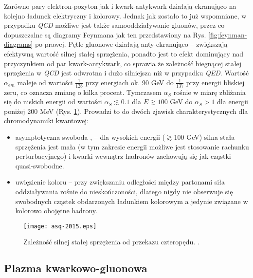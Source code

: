 Zarówno pary elektron-pozyton jak i kwark-antykwark działają ekranująco na kolejno ładunek elektryczny i kolorowy. Jednak jak zostało to już wspomniane, w przypadku \textit{QCD} możliwe jest także samooddziaływanie gluonów, przez co dopuszczalne są diagramy Feynmana jak ten przedstawiony na Rys. \ref{fig:feynman-diagrams} po prawej. Pętle gluonowe działają anty-ekranująco -- zwiększają efektywną wartość silnej stałej sprzężenia, ponadto jest to efekt dominujący nad przyczynkiem od par kwark-antykwark, co sprawia że zależność biegnącej stałej sprzężenia w \textit{QCD} jest odwrotna i dużo silniejsza niż w przypadku \textit{QED}. Wartość $\alpha_{em}$ maleje od wartości $\frac{1}{128}$ przy energiach ok. 90 GeV do $\frac{1}{137}$ przy energii bliskiej zeru, co oznacza zmianę o kilka procent. 
Tymczasem $\alpha_S$ rośnie w miarę zbliżania się do niskich energii od wartości $\alpha_S\lesssim 0.1$ dla $E \gtrsim 100$ GeV do $\alpha_S > 1$ dla energii poniżej 200 MeV (Rys. \ref{fig:running-coupling-const}). Prowadzi to do dwóch zjawisk charakterystycznych dla chromodynamiki kwantowej: 
\begin{itemize}
	\item asymptotyczna swoboda  \cite{Gross:1973id}, \cite{Politzer:1973fx} -- dla wysokich energii ($\gtrsim 100$ GeV) silna stała sprzężenia jest mała (w tym zakresie energii możliwe jest stosowanie rachunku perturbacyjnego) i kwarki wewnątrz hadronów zachowują się jak cząstki quasi-swobodne.
	\item uwięzienie koloru  -- przy zwiększaniu odległości między partonami siła oddziaływania rośnie do nieskończoności, dlatego nigdy nie obserwuje się swobodnych cząstek obdarzonych ładunkiem kolorowym a jedynie związane w kolorowo obojętne hadrony.
\end{itemize}


\begin{figure}[h]
	\centering
	\texttt{[image: asq-2015.eps]}
	\caption{Zależność silnej stałej sprzężenia od przekazu czteropędu. .}
	\label{fig:running-coupling-const}
\end{figure}


\subsection{Plazma kwarkowo-gluonowa}
\label{subsec:qgp}

